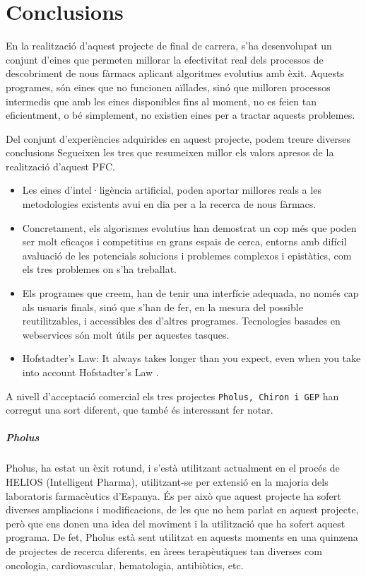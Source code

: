 \chapter{Conclusions} %
\label{cha:Conclusions}

En la realització d'aquest projecte de final de carrera, s'ha desenvolupat un
conjunt d'eines que permeten millorar la efectivitat real dels processos de
descobriment de nous fàrmacs aplicant algoritmes evolutius amb èxit.
Aquests programes, són eines que no funcionen aïllades, sinó que milloren
processos intermedis que amb les eines disponibles fins al moment, no es feien
tan eficientment, o bé simplement, no existien eines per a tractar aquests
problemes.

Del conjunt d'experiències adquirides en aquest projecte, podem treure diverses
conclusions  Segueixen les tres que resumeixen millor els valors apresos de la
realització d'aquest PFC.

\begin{itemize}
	\item Les eines d'intel·ligència artificial, poden aportar millores reals a
		les metodologies existents avui en dia per a la recerca de nous fàrmacs.
	\item Concretament, els algorismes evolutius han demostrat un cop més que poden ser molt eficaços i competitius en grans espais de cerca, entorns amb difícil avaluació de les potencials solucions i problemes complexos i epistàtics, com els tres problemes on s'ha treballat.
	\item Els programes que creem, han de tenir una interfície adequada, no
		només cap als usuaris finals, sinó que s'han de fer, en la mesura del
		possible reutilitzables, i accessibles des d'altres programes.
		Tecnologies basades en webservices són molt útils per aquestes tasques.
	\item Hofstadter's Law: It always takes longer than you expect, even when
		you take into account Hofstadter's Law \cite{GEB79}.
\end{itemize}

A nivell d'acceptació comercial els tres projectes \texttt{Pholus, Chiron i GEP}
han corregut una sort diferent, que també és interessant fer notar.

\paragraph{Pholus} %
\label{par:Pholus}

Pholus, ha estat un èxit rotund, i s'està utilitzant actualment en el procés de
HELIOS (Intelligent Pharma), utilitzant-se per extensió en la majoria dels laboratoris
farmacèutics d'Espanya.  És per això que aquest projecte ha sofert diverses
ampliacions i modificacions, de les que no hem parlat en aquest projecte, però
que ens donen una idea del moviment i la utilització que ha sofert aquest
programa. De fet, Pholus està sent utilitzat en aquests moments en una quinzena de projectes de recerca diferents, en àrees terapèutiques tan diverses com oncologia, cardiovascular, hematologia, antibiòtics, etc.

